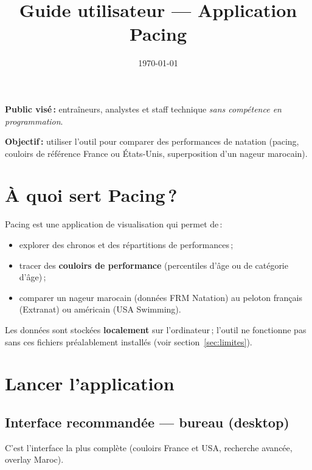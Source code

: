 \documentclass[11pt,a4paper]{article}
\title{Guide utilisateur --- Application Pacing}
\author{}
\date{\today}
\begin{document}
\maketitle
\thispagestyle{empty}
\vspace{-1.2em}

\noindent\textbf{Public visé\,:} entraîneurs, analystes et staff technique \emph{sans compétence en programmation}.

\noindent\textbf{Objectif\,:} utiliser l'outil pour comparer des performances de natation (pacing, couloirs de référence France ou États-Unis, superposition d'un nageur marocain).

\tableofcontents
\newpage

\section{À quoi sert Pacing\,?}

Pacing est une application de visualisation qui permet de\,:
\begin{itemize}
  \item explorer des chronos et des répartitions de performances\,;
  \item tracer des \textbf{couloirs de performance} (percentiles d'âge ou de catégorie d'âge)\,;
  \item comparer un nageur marocain (données FRM Natation) au peloton français (Extranat) ou américain (USA Swimming).
\end{itemize}

\noindent Les données sont stockées \textbf{localement} sur l'ordinateur\,; l'outil ne fonctionne pas sans ces fichiers préalablement installés (voir section~\ref{sec:limites}).

\section{Lancer l'application}

\subsection{Interface recommandée --- bureau (desktop)}

C'est l'interface la plus complète (couloirs France et USA, recherche avancée, overlay Maroc).
\end{document}
